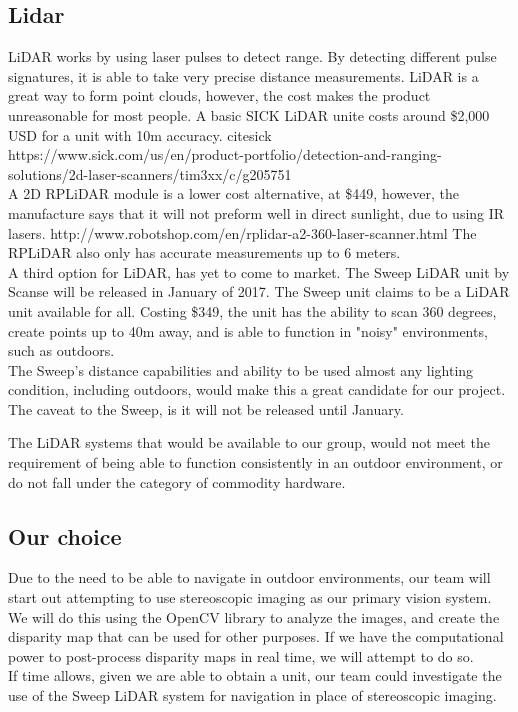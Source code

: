 \documentclass[compsoc,draftclsnofoot,onecolumn,10pt]{IEEEtran}
\begin{document}
\subsection{Lidar}
LiDAR works by using laser pulses to detect range. 
By detecting different pulse signatures, it is able to take very precise distance measurements. 
LiDAR is a great way to form point clouds, however, the cost makes the product unreasonable for most people. 
A basic SICK LiDAR unite costs around \$2,000 USD for a unit with 10m accuracy. cite{sick} https://www.sick.com/us/en/product-portfolio/detection-and-ranging-solutions/2d-laser-scanners/tim3xx/c/g205751\\
A 2D RPLiDAR module is a lower cost alternative, at \$449, however, the manufacture says that it will not preform well in direct sunlight, due to using IR lasers. http://www.robotshop.com/en/rplidar-a2-360-laser-scanner.html
The RPLiDAR also only has accurate measurements up to 6 meters.\\
A third option for LiDAR, has yet to come to market. 
The Sweep LiDAR unit by Scanse will be released in January of 2017. 
The Sweep unit claims to be a LiDAR unit available for all.
Costing \$349, the unit has the ability to scan 360 degrees, create points up to 40m away, and is able to function in "noisy" environments, such as outdoors. \\
The Sweep's distance capabilities and ability to be used almost any lighting condition, including outdoors, would make this a great candidate for our project.
The caveat to the Sweep, is it will not be released until January. \par
The LiDAR systems that would be available to our group, would not meet the requirement of being able to function consistently in an outdoor environment, or do not fall under the category of commodity hardware. 

\subsection{Our choice}
Due to the need to be able to navigate in outdoor environments, our team will start out attempting to use stereoscopic imaging as our primary vision system. We will do this using the OpenCV library to analyze the images, and create the disparity map that can be used for other purposes. If we have the computational power to post-process disparity maps in real time, we will attempt to do so. \\
If time allows, given we are able to obtain a unit, our team could investigate the use of the Sweep LiDAR system for navigation in place of stereoscopic imaging. 
\end{document}
